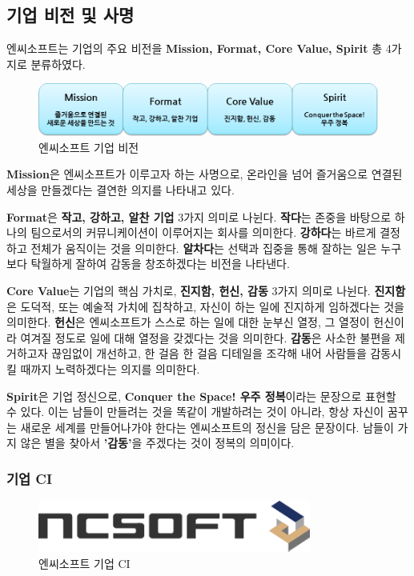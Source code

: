 \documentclass[11pt]{oblivoir}
\begin{document}
		\subsection{기업 비전 및 사명}
			엔씨소프트는 기업의 주요 비전을 \textbf{Mission, Format, Core Value, Spirit} 총 4가지로 분류하였다. 
			\begin{figure}[htbp]
				\centering
				\includegraphics[width=1\textwidth]{Pictures/vision.png}
				\caption{엔씨소프트 기업 비전}
			\end{figure}

			\textbf{Mission}은 엔씨소프트가 이루고자 하는 사명으로, 온라인을 넘어 즐거움으로 연결된 세상을 만들겠다는 결연한 의지를 나타내고 있다.
			
			\textbf{Format}은 \textbf{작고, 강하고, 알찬 기업} 3가지 의미로 나뉜다. 
			\textbf{작다}는 존중을 바탕으로 하나의 팀으로서의 커뮤니케이션이 이루어지는 회사를 의미한다. \textbf{강하다}는 바르게 결정하고 전체가 움직이는 것을 의미한다. \textbf{알차다}는 선택과 집중을 통해 잘하는 일은 누구보다 탁월하게 잘하여 감동을 창조하겠다는 비전을 나타낸다.
			
			\textbf{Core Value}는 기업의 핵심 가치로, \textbf{진지함, 헌신, 감동} 3가지 의미로 나뉜다. \textbf{진지함}은 도덕적, 또는 예술적 가치에 집착하고, 자신이 하는 일에 진지하게 임하겠다는 것을 의미한다. \textbf{헌신}은 엔씨소프트가 스스로 하는 일에 대한 눈부신 열정, 그 열정이 헌신이라 여겨질 정도로 일에 대해 열정을 갖겠다는 것을 의미한다. \textbf{감동}은 사소한 불편을 제거하고자 끊임없이 개선하고, 한 걸음 한 걸음 디테일을 조각해 내어 사람들을 감동시킬 때까지 노력하겠다는 의지를 의미한다.
			
			\textbf{Spirit}은 기업 정신으로, \textbf{Conquer the Space! 우주 정복}이라는 문장으로 표현할 수 있다. 이는 남들이 만들려는 것을 똑같이 개발하려는 것이 아니라, 항상 자신이 꿈꾸는 새로운 세계를 만들어나가야 한다는 엔씨소프트의 정신을 담은 문장이다. 남들이 가지 않은 별을 찾아서 \textbf{'감동'}을 주겠다는 것이 정복의 의미이다.

		\subsubsection{기업 CI}
			\begin{figure}[htbp]
				\centering
				\includegraphics[width=0.8\textwidth]{Pictures/ci.png}
				\caption{엔씨소프트 기업 CI}
			\end{figure}
			
\end{document}
